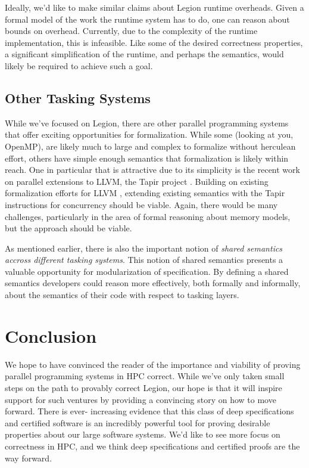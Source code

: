 \documentclass[sigconf]{acmart}
\begin{document}
Ideally, we'd like to make similar claims about Legion runtime overheads.
Given a formal model of the work the runtime system has to do, one can reason
about bounds on overhead. Currently, due to the complexity of the runtime
implementation, this is infeasible. Like some of the desired correctness
properties, a significant simplification of the runtime, and perhaps the
semantics, would likely be required to achieve such a goal.


\subsection{Other Tasking Systems}

While we've focused on Legion, there are other parallel programming systems
that offer exciting opportunities for formalization. While some (looking at
you, OpenMP), are likely much to large and complex to formalize without
herculean effort, others have simple enough semantics that formalization is
likely within reach. One in particular that is attractive due to its simplicity
is the recent work on parallel extensions to LLVM, the Tapir project
\cite{tapir}. Building on existing formalization efforts for LLVM
\cite{verillvm}, extending existing semantics with the Tapir instructions for
concurrency should be viable. Again, there would be many challenges,
particularly in the area of formal reasoning about memory models, but the
approach should be viable.

As mentioned earlier, there is also the important notion of \emph{shared
semantics accross different tasking systems}. This notion of shared semantics
presents a valuable opportunity for modularization of specification. By defining
a shared semantics developers could reason more effectively, both formally and
informally, about the semantics of their code with respect to tasking layers.

\section{Conclusion}

We hope to have convinced the reader of the importance and viability of proving
parallel programming systems in HPC correct. While we've only taken small steps
on the path to provably correct Legion, our hope is that it will inspire
support for such ventures by providing a convincing story on how to move
forward. There is ever- increasing evidence that this class of deep
specifications and certified software is an incredibly powerful tool for
proving desirable properties about our large software systems. We'd like to see
more focus on correctness in HPC, and we think deep specifications and
certified proofs are the way forward.




\end{document}
